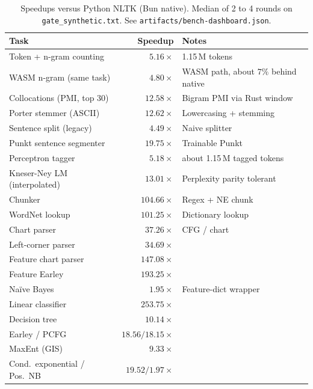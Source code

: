\documentclass[pdflatex,sn-mathphys-num]{sn-jnl}
\theoremstyle{thmstyleone}
\begin{document}
\begin{table}[t]
\centering
\caption{Speedups versus Python NLTK (Bun native). Median of 2 to 4 rounds on \texttt{gate\_synthetic.txt}. See \texttt{artifacts/bench-dashboard.json}.}
\label{tab:speedup}
\begin{tabular}{@{}l r l@{}}
\toprule
Task & Speedup & Notes \\
\midrule
Token + n-gram counting      & $5.16\times$   & 1.15\,M tokens \\
WASM n-gram (same task)     & $4.80\times$   & WASM path, about $7\%$ behind native \\
Collocations (PMI, top 30)  & $12.58\times$  & Bigram PMI via Rust window \\
Porter stemmer (ASCII)      & $12.62\times$  & Lowercasing + stemming \\
Sentence split (legacy)     & $4.49\times$   & Naive splitter \\
Punkt sentence segmenter    & $19.75\times$  & Trainable Punkt \\
Perceptron tagger           & $5.18\times$   & about 1.15\,M tagged tokens \\
Kneser-Ney LM (interpolated)& $13.01\times$  & Perplexity parity tolerant \\
Chunker                    & $104.66\times$ & Regex + NE chunk \\
WordNet lookup             & $101.25\times$ & Dictionary lookup \\
Chart parser               & $37.26\times$  & CFG / chart \\
Left-corner parser         & $34.69\times$  &  \\
Feature chart parser       & $147.08\times$ &  \\
Feature Earley             & $193.25\times$ &  \\
Na\"ive Bayes              & $1.95\times$   & Feature-dict wrapper \\
Linear classifier          & $253.75\times$ &  \\
Decision tree              & $10.14\times$  &  \\
Earley / PCFG              & $18.56 / 18.15\times$ &  \\
MaxEnt (GIS)               & $9.33\times$   &  \\
Cond.\ exponential / Pos.\ NB & $19.52 / 1.97\times$ &  \\
\bottomrule
\end{tabular}
\end{table}
\end{document}
